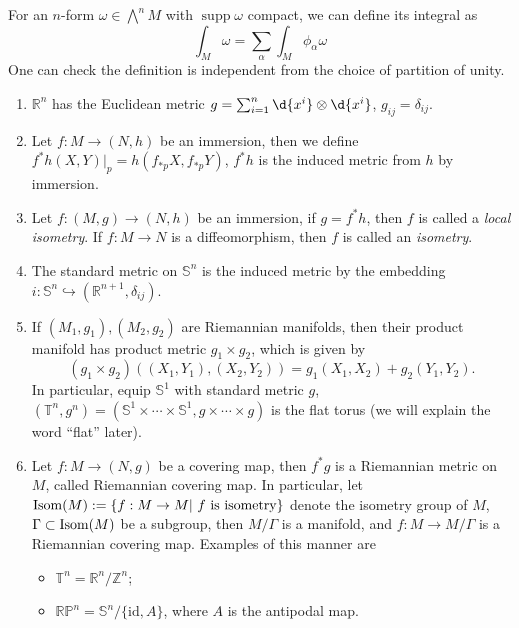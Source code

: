 \begin{rem}
    For an $n$-form $\omega\in\bigwedge^nM$ with $\operatorname{supp}\omega$ compact, we can define its integral as
    \[\int_M\omega=\sum_\alpha\int_M\phi_\alpha\omega\]
    One can check the definition is independent from the choice of partition of unity.
\end{rem}

\begin{eg}
    \begin{enumerate}[(1)]
        \item $\mathbb{R}^n$ has the Euclidean metric $g=\sum_{i=1}^n\d{x^i}\otimes\d{x^i}$, $g_{ij}=\delta_{ij}$.
        \item Let $f:M\to(N,h)$ be an immersion, then we define $f^*h(X,Y)|_p=h(f_{*p}X,f_{*p}Y)$, $f^*h$ is the induced metric from $h$ by immersion.
        \item Let $f:(M,g)\to(N,h)$ be an immersion, if $g=f^*h$, then $f$ is called a \emph{local isometry}.
        If $f:M\to N$ is a diffeomorphism, then $f$ is called an \emph{isometry}.
        \item The standard metric on $\mathbb{S}^n$ is the induced metric by the embedding $i:\mathbb{S}^n\hookrightarrow(\mathbb{R}^{n+1},\delta_{ij})$.
        \item If $(M_1,g_1),(M_2,g_2)$ are Riemannian manifolds, then their product manifold has product metric $g_1\times g_2$, which is given by
        \[(g_1\times g_2)((X_1,Y_1),(X_2,Y_2))=g_1(X_1,X_2)+g_2(Y_1,Y_2).\]
        In particular, equip $\mathbb{S}^1$ with standard metric $g$, $(\mathbb{T}^n,g^n)=(\mathbb{S}^1\times\cdots\times\mathbb{S}^1,g\times\cdots\times g)$ is the flat torus (we will explain the word ``flat'' later).
        \item Let $f:M\to(N,g)$ be a covering map, then $f^*g$ is a Riemannian metric on $M$, called Riemannian covering map.
        In particular, let $\operatorname{Isom}(M):=\{f:M\to M|\ f\ \text{is isometry}\}$ denote the isometry group of $M$, $\Gamma\subset\operatorname{Isom}(M)$ be a subgroup, then $M/\Gamma$ is a manifold, and $f:M\to M/\Gamma$ is a Riemannian covering map.
        Examples of this manner are
        \begin{itemize}
            \item $\mathbb{T}^n=\mathbb{R}^n/\mathbb{Z}^n$;
            \item $\mathbb{RP}^n=\mathbb{S}^n/\{\mathrm{id},A\}$, where $A$ is the antipodal map.
        \end{itemize}
    \end{enumerate}
\end{eg}

